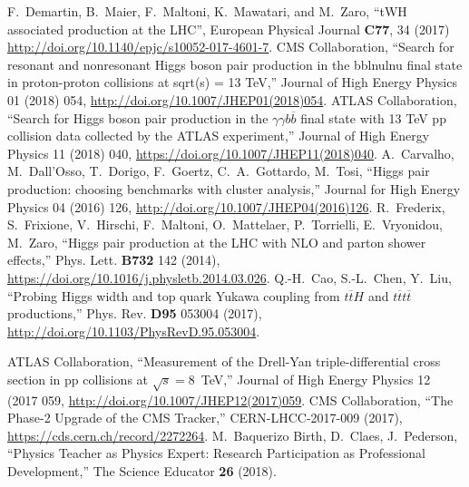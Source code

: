 \begin{thebibliography}{99}
  F.~Demartin, B.~Maier, F.~Maltoni, K.~Mawatari, and M.~Zaro, ``tWH
  associated production at the LHC'', European Physical Journal {\bf C77}, 34 (2017)
  \url{http://doi.org/10.1140/epjc/s10052-017-4601-7}. 
%
%
    CMS Collaboration, ``Search for resonant and nonresonant Higgs boson pair production in the bblnulnu final state in proton-proton collisions at sqrt(s) = 13 TeV,'' 
    Journal of High Energy Physics 01 (2018) 054, \url{http://doi.org/10.1007/JHEP01(2018)054}.
%
    ATLAS Collaboration, ``Search for Higgs boson pair production in the $\gamma\gamma b\overline{b}$ final state with 13 TeV pp collision data collected by the ATLAS experiment,''
    Journal of High Energy Physics 11 (2018) 040, \url{https://doi.org/10.1007/JHEP11(2018)040}.
%
    A.~Carvalho, M.~Dall’Osso, T.~Dorigo, F.~Goertz, C.~A.~Gottardo, M.~Tosi,
    ``Higgs pair production: choosing benchmarks with cluster analysis,''
    Journal for High Energy Physics 04 (2016) 126, \url{http://doi.org/10.1007/JHEP04(2016)126}.
%
%
%
 R.~Frederix, S.~Frixione, V.~Hirschi,
  F.~Maltoni, O.~Mattelaer, P.~Torrielli, E.~Vryonidou, M.~Zaro, ``Higgs
  pair production at the LHC with NLO and parton shower effects,''
  Phys. Lett. {\bf B732} 142 (2014), \url{ https://doi.org/10.1016/j.physletb.2014.03.026}.
    Q.-H.~Cao, S.-L.~Chen, Y.~Liu,
    ``Probing Higgs width and top quark Yukawa coupling from $t\overline{t}H$ and $t\overline{t}t\overline{t}$ productions,''
    Phys. Rev. {\bf D95} 053004 (2017), \url{http://doi.org/10.1103/PhysRevD.95.053004}.

%
    ATLAS Collaboration, ``Measurement of the Drell-Yan triple-differential cross section in pp collisions at $\sqrt{s}=$8~TeV,''
    Journal of High Energy Physics 12 (2017 059, \url{http://doi.org/10.1007/JHEP12(2017)059}.
%
CMS Collaboration, ``The Phase-2 Upgrade of the CMS Tracker,'' CERN-LHCC-2017-009 (2017),
\url{https://cds.cern.ch/record/2272264}.
%
 M.~Baquerizo Birth, D.~Claes, J.~Pederson, ``Physics Teacher as Physics Expert: Research Participation as Professional Development,''  The Science Educator {\bf 26} (2018).
\end{thebibliography}
